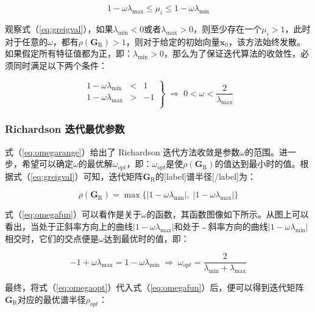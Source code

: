 \documentclass[12pt, UTF8, nofonts]{ctexart}
\begin{document}
\begin{equation}
  \label{eq:greigval}
  1-\omega\lambda_{\max} \leq \mu_i \leq 1-\omega\lambda_{\min}
\end{equation}

观察式（\ref{eq:greigval}），如果$\lambda_{\min}<0$或者$\lambda_{\max}>0$，则至少存在一个$\mu_i>1$，此时对于任意的$\omega$，都有$\rho(\boldsymbol{G}_{\mathrm{R}})>1$，则对于给定的初始向量$\boldsymbol{x}_0$，该方法始终发散。如果假定所有特征值都为正，即：$\lambda_{\min}>0$，那么为了保证迭代算法的收敛性，必须同时满足以下两个条件：

\begin{equation}
  \label{eq:omegarange}
  \left.\begin{array}{ccc}
    1 - \omega\lambda_{\min} & < & 1 \\
    1 - \omega\lambda_{\max} & > & -1 \\
  \end{array}\right\} \;\Rightarrow\; 0 < \omega < \dfrac{2}{\lambda_{\max}}
\end{equation}

\subsubsection*{Richardson 迭代最优参数}

式（\ref{eq:omegarange}）给出了 Richardson 迭代方法收敛是参数$\omega$的范围。进一步，希望可以确定$\omega$的最优解$\omega_{opt}$，即：$\omega_{opt}$是使$\rho(\boldsymbol{G}_{\mathrm{R}})$的值达到最小时的值。根据式（\ref{eq:greigval}）可知，迭代矩阵$\boldsymbol{G}_{\mathrm{R}}$的[label]谱半径[/label]为：

\begin{equation}
  \label{eq:omegafun}
  \rho(\boldsymbol{G}_{\mathrm{R}}) = \max\Big\{
    |1-\omega\lambda_{\min}|,\;|1-\omega\lambda_{\max}|
  \Big\}
\end{equation}

式（\ref{eq:omegafun}）可以看作是关于$\omega$的函数，其函数图像如下所示。从图上可以看出，当处于正斜率方向上的曲线$|1-\omega\lambda_{\max}|$和处于﹣斜率方向的曲线$|1-\omega\lambda_{\min}|$相交时，它们的交点便是$\omega$达到最优时的值，即：

\begin{equation}
  \label{eq:omegaopt}
  -1 + \omega\lambda_{\max} = 1 - \omega\lambda_{\min} \;\Rightarrow\;
  \omega_{opt} = \dfrac{2}{\lambda_{\min}+\lambda_{\max}}
\end{equation}

最终，将式（\ref{eq:omegaopt}）代入式（\ref{eq:omegafun}）后，便可以得到迭代矩阵$\boldsymbol{G}_{\mathrm{R}}$对应的最优谱半径$\rho_{opt}$：
\end{document}
